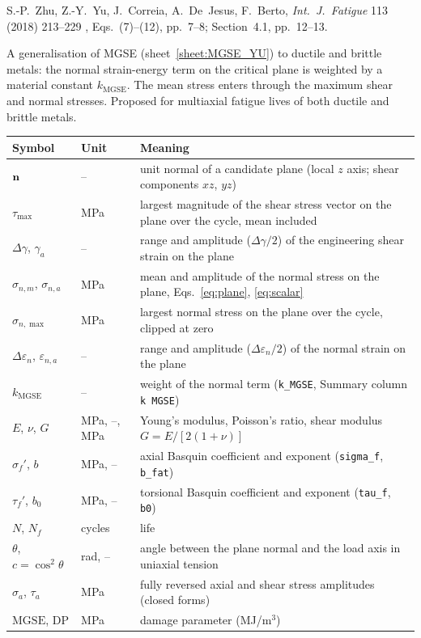 \label{sheet:MGSE_ZHU}

 S.-P.~Zhu, Z.-Y.~Yu, J.~Correia, A.~De~Jesus, F.~Berto, \emph{Int.\ J.\ Fatigue} 113
(2018) 213--229 \cite{zhu2018}, Eqs.~(7)--(12), pp.~7--8; Section~4.1, pp.~12--13.

 A generalisation of MGSE (sheet~\ref{sheet:MGSE_YU}) to ductile and brittle
metals: the normal strain-energy term on the critical plane is weighted by a material constant
$k_\mathrm{MGSE}$. The mean stress enters through the maximum shear and normal stresses. Proposed
for multiaxial fatigue lives of both ductile and brittle metals.

\begin{center}\small
\begin{tabular}{@{}llp{100mm}@{}}
\toprule
Symbol & Unit & Meaning\\\midrule
$\mathbf n$ & -- & unit normal of a candidate plane (local $z$ axis; shear components $xz$, $yz$)\\
$\tau_{\max}$ & MPa & largest magnitude of the shear stress vector on the plane over the cycle, mean included\\
$\Delta\gamma$, $\gamma_a$ & -- & range and amplitude ($\Delta\gamma/2$) of the engineering shear strain on the plane\\
$\sigma_{n,m}$, $\sigma_{n,a}$ & MPa & mean and amplitude of the normal stress on the plane, Eqs.~\eqref{eq:plane}, \eqref{eq:scalar}\\
$\sigma_{n,\max}$ & MPa & largest normal stress on the plane over the cycle, clipped at zero\\
$\Delta\varepsilon_n$, $\varepsilon_{n,a}$ & -- & range and amplitude ($\Delta\varepsilon_n/2$) of the normal strain on the plane\\
$k_\mathrm{MGSE}$ & -- & weight of the normal term (\texttt{k\_MGSE}, Summary column \texttt{k MGSE})\\
$E$, $\nu$, $G$ & MPa, --, MPa & Young's modulus, Poisson's ratio, shear modulus $G=E/[2(1+\nu)]$\\
$\sigma_f'$, $b$ & MPa, -- & axial Basquin coefficient and exponent (\texttt{sigma\_f}, \texttt{b\_fat})\\
$\tau_f'$, $b_0$ & MPa, -- & torsional Basquin coefficient and exponent (\texttt{tau\_f}, \texttt{b0})\\
$N$, $N_f$ & cycles & life\\
$\theta$, $c=\cos^2\theta$ & rad, -- & angle between the plane normal and the load axis in uniaxial tension\\
$\sigma_a$, $\tau_a$ & MPa & fully reversed axial and shear stress amplitudes (closed forms)\\
$\mathrm{MGSE}$, $\mathrm{DP}$ & MPa & damage parameter (MJ/m$^3$)\\
\bottomrule
\end{tabular}
\end{center}

